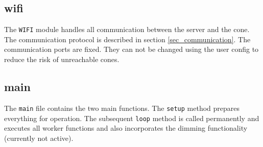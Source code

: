 \subsection{wifi}
The \texttt{WIFI} module handles all communication between the server and the cone. The communication protocol is described in section \ref{sec_communication}. The communication ports are fixed. They can not be changed using the user config to reduce the risk of unreachable cones. 

\subsection{main}
The \texttt{main} file contains the two main functions. The \texttt{setup} method prepares everything for operation. The subsequent \texttt{loop} method is called permanently and executes all worker functions and also incorporates the dimming functionality (currently not active). 